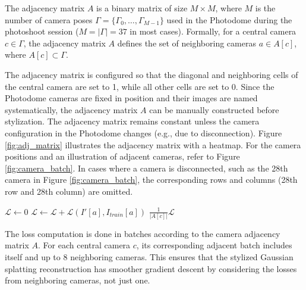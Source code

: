 The adjacency matrix $A$ is a binary matrix of size $M \times M$, where $M$ is the number of camera poses $\varGamma = \{\varGamma_0, \dots, \varGamma_{M-1}\}$ used in the Photodome during the photoshoot session ($M = |\varGamma| = 37$ in most cases). Formally, for a central camera $c \in \varGamma$, the adjacency matrix $A$ defines the set of neighboring cameras $a \in A[c]$, where $A[c] \subset \varGamma$.

The adjacency matrix is configured so that the diagonal and neighboring cells of the central camera are set to 1, while all other cells are set to 0. Since the Photodome cameras are fixed in position and their images are named systematically, the adjacency matrix $A$ can be manually constructed before stylization. The adjacency matrix remains constant unless the camera configuration in the Photodome changes (e.g., due to disconnection). Figure \ref{fig:adj_matrix} illustrates the adjacency matrix with a heatmap. For the camera positions and an illustration of adjacent cameras, refer to Figure \ref{fig:camera_batch}. In cases where a camera is disconnected, such as the 28th camera in Figure \ref{fig:camera_batch}, the corresponding rows and columns (28th row and 28th column) are omitted.

\begin{algorithm}
	\caption{$\mathsf{AdjacencyLosses}(I', I_{train}, A[c])$} \label{alg:batch_update}
	\begin{algorithmic}
		\State $\mathcal{L} \gets 0$  
		  
		\State $\mathcal{L} \gets \mathcal{L} + \mathcal{L}(I'[a],I_{train}[a]) $
      	\EndFor
		\State \Return $\frac {1}{\vert A[c] \vert} \mathcal{L}$  
	\end{algorithmic}

\end{algorithm}

The loss computation is done in batches according to the camera adjacency matrix $A$. For each central camera $c$, its corresponding adjacent batch includes itself and up to 8 neighboring cameras. This ensures that the stylized Gaussian splatting reconstruction has smoother gradient descent by considering the losses from neighboring cameras, not just one.


